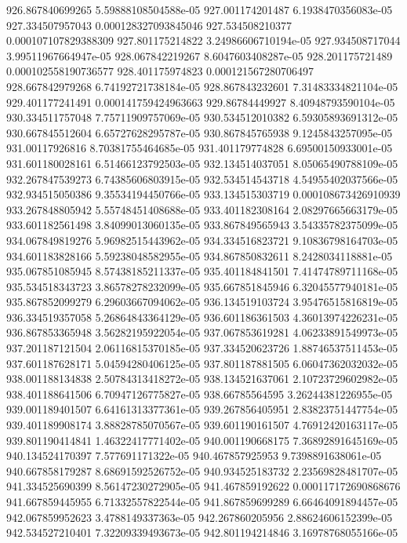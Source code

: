 {926.867840699265 5.59888108504588e-05
927.001174201487 6.1938470356083e-05
927.334507957043 0.000128327093845046
927.534508210377 0.000107107829388309
927.801175214822 3.24986606710194e-05
927.934508717044 3.99511967664947e-05
928.067842219267 8.6047603408287e-05
928.201175721489 0.000102558190736577
928.401175974823 0.000121567280706497
928.667842979268 6.74192721738184e-05
928.867843232601 7.31483334821104e-05
929.401177241491 0.000141759424963663
929.86784449927 8.40948793590104e-05
930.334511757048 7.75711909757069e-05
930.534512010382 6.59305893691312e-05
930.667845512604 6.65727628295787e-05
930.867845765938 9.1245843257095e-05
931.00117926816 8.70381755464685e-05
931.401179774828 6.69500150933001e-05
931.601180028161 6.51466123792503e-05
932.134514037051 8.05065490788109e-05
932.267847539273 6.74385606803915e-05
932.534514543718 4.54955402037566e-05
932.934515050386 9.35534194450766e-05
933.134515303719 0.000108673426910939
933.267848805942 5.55748451408688e-05
933.401182308164 2.08297665663179e-05
933.601182561498 3.84099013060135e-05
933.867849565943 3.54335782375099e-05
934.067849819276 5.96982515443962e-05
934.334516823721 9.10836798164703e-05
934.601183828166 5.59238048582955e-05
934.867850832611 8.2428034118881e-05
935.067851085945 8.57438185211337e-05
935.401184841501 7.41474789711168e-05
935.534518343723 3.86578278232099e-05
935.667851845946 6.32045577940181e-05
935.867852099279 6.29603667094062e-05
936.134519103724 3.95476515816819e-05
936.334519357058 5.26864843364129e-05
936.601186361503 4.36013974226231e-05
936.867853365948 3.56282195922054e-05
937.067853619281 4.06233891549973e-05
937.201187121504 2.06116815370185e-05
937.334520623726 1.88746537511453e-05
937.601187628171 5.04594280406125e-05
937.801187881505 6.06047362032032e-05
938.001188134838 2.50784313418272e-05
938.134521637061 2.10723729602982e-05
938.401188641506 6.70947126775827e-05
938.66785564595 3.26244381226955e-05
939.001189401507 6.64161313377361e-05
939.267856405951 2.83823751447754e-05
939.401189908174 3.88828785070567e-05
939.601190161507 4.76912420163117e-05
939.801190414841 1.46322417771402e-05
940.001190668175 7.36892891645169e-05
940.134524170397 7.577691171322e-05
940.467857925953 9.7398891638061e-05
940.667858179287 8.68691592526752e-05
940.934525183732 2.23569828481707e-05
941.334525690399 8.56147230272905e-05
941.467859192622 0.000117172690868676
941.667859445955 6.71332557822544e-05
941.867859699289 6.66464091894457e-05
942.067859952623 3.4788149337363e-05
942.267860205956 2.88624606152399e-05
942.534527210401 7.32209339493673e-05
942.801194214846 3.16978768055166e-05
}
